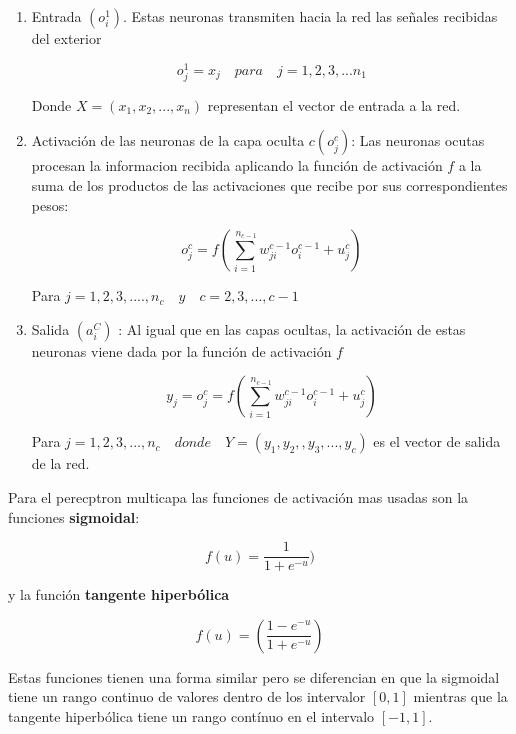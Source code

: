 \documentclass[12pt]{article}
\begin{document}
\begin{enumerate}
\item 
Entrada $(o_i^1)$. Estas neuronas transmiten hacia la red las señales recibidas del exterior

\begin{equation} \label{eq4}
o_j^1 = x_j \quad para \quad j=1,2,3,...n_1
\end{equation}

Donde  $X = (x_1,x_2,...,x_n)$ representan el vector de entrada a la red.

\item
Activación de las neuronas de  la capa oculta $c (o_j^c)$: Las neuronas ocutas procesan la informacion recibida aplicando la función de activación $f$ a la suma de los productos de las activaciones que recibe por sus correspondientes pesos:


\begin{equation} \label{eq5}
o_j^c = f(\sum_{i=1}^{\ n_{c-1}} w_{ji}^{c-1}o_i^{c-1} + u_j^c)
\end{equation}

Para $j = 1,2,3,....,n_c \quad y \quad c=2,3,...,c-1$

\item
Salida $(a_i^C)$ : Al igual que en las capas ocultas, la activación de estas neuronas viene dada por la función de activación $f$

\begin{equation} \label{eq6}
y_j = o_j^c = f(\sum_{i=1}^{\ n_{c-1}} w_{ji}^{c-1}o_i^{c-1} + u_j^c)
\end{equation}

Para $j=1,2,3,...,n_c \quad donde \quad Y=(y_1,y_2,,y_3,...,y_c)$ es el vector de salida de la red.

\end{enumerate}

Para el perecptron multicapa las funciones de activación mas usadas son la funciones \textbf{sigmoidal}:

\begin{equation} \label{eq6}
f(u) = \frac{1}{1+e^{-u}})
\end{equation}

y la función \textbf{tangente hiperbólica}

\begin{equation} \label{eq7}
f(u) = ( \frac{1 - e^{-u}}{1 + e^{-u}}) 
\end{equation}

Estas funciones tienen una forma similar pero se diferencian en que la sigmoidal tiene un rango continuo de valores dentro de los intervalor $[0,1]$ mientras que la tangente hiperbólica tiene un rango contínuo en el intervalo $[-1,1]$.
\end{document}
